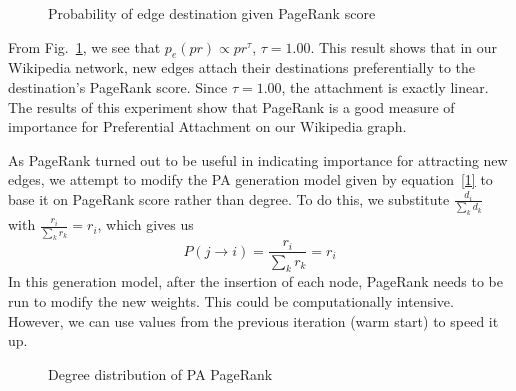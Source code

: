 \documentclass[10pt,twocolumn]{article}
\begin{document}
\begin{figure}[ht]
\caption{Probability of edge destination given PageRank score\label{fig:pa_pagerank}}
\end{figure}

From Fig.~\ref{fig:pa_pagerank}, we see that $p_e(pr)\propto pr^\tau$, $\tau = 1.00$. This result shows that in our Wikipedia network, new edges attach their destinations preferentially to the destination's PageRank score. Since $\tau = 1.00$, the attachment is exactly linear. The results of this experiment show that PageRank is a good measure of importance for Preferential Attachment on our Wikipedia graph.

As PageRank turned out to be useful in indicating importance for attracting new edges, we attempt to modify the PA generation model given by equation~\eqref{1} to base it on PageRank score rather than degree. To do this, we substitute $\frac{d_i}{\sum\limits_{k}d_k}$ with $\frac{r_i}{\sum\limits_{k}r_k}=r_i$, which gives us
\begin{equation}
\label{5}
P(j\rightarrow i)=\frac{r_i}{\sum\limits_{k}r_k}=r_i
\end{equation}
In this generation model, after the insertion of each node, PageRank needs to be run to modify the new weights. This could be computationally intensive.  However, we can use values from the previous iteration (warm start) to speed it up.

\begin{figure}[ht]
\caption{Degree distribution of PA PageRank} \label{fig:pa_pr_deg_dist}
\end{figure}
\end{document}
